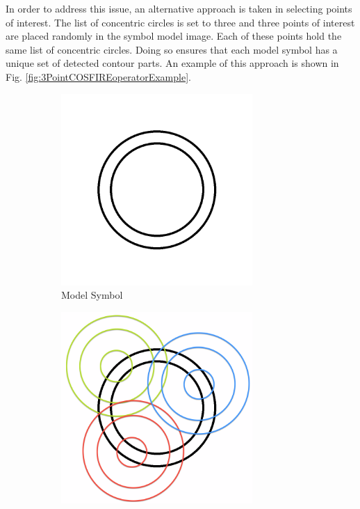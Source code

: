 In order to address this issue, an alternative approach is taken in selecting points of interest. The list of concentric circles is set to three and three points of interest are placed randomly in the symbol model image. Each of these points hold the same list of concentric circles. Doing so ensures that each model symbol has a unique set of detected contour parts. An example of this approach is shown in Fig. \ref{fig:3PointCOSFIREoperatorExample}.

\begin{figure}[h]
        \centering
        \begin{subfigure}[b]{0.4\textwidth}
                \centering
                \includegraphics[width=0.8\textwidth]{figures/Method/ModelSymbol2_2.png}
                \caption{Model Symbol}
                \label{fig:modelsymbol}
        \end{subfigure}
        \begin{subfigure}[b]{0.4\textwidth}
                \centering
                \includegraphics[width=0.8\textwidth]{figures/Method/CosfireOperatorThreePointApproach.png}

\end{subfigure}
\end{figure}
